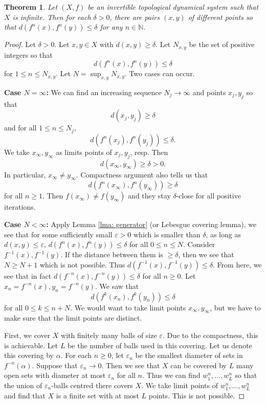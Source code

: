 \documentclass[12pt]{article}
\newtheorem{theorem}{Theorem}[section]
\theoremstyle{definition}
\theoremstyle{remark}
\begin{document}
\begin{theorem}
    Let $(X,f)$ be an invertible topological dynamical system such that $X$ is infinite. Then for each $\delta>0$, there are pairs $(x,y)$ of different points so that $d(f^n(x),f^n(y))\leq\delta$ for any $n\in\mathbb{N}$.
\end{theorem}
\begin{proof}
    Let $\delta>0$. Let $x,y\in X$ with $d(x,y)\geq \delta$. Let $N_{x,y}$ be the set of positive integers so that
    \[
    d(f^n(x),f^n(y))\leq \delta
    \]
    for $1\leq n\leq N_{x,y}.$ Let $N=\sup_{x,y}N_{x,y}.$ Two cases can occur.

    \textbf{Case $N=\infty$:} We can find an increasing sequence $N_j\to\infty$ and points $x_j,y_j$ so that
    \[
    d(x_j,y_j)\geq \delta
    \]
    and for all $1\leq n\leq N_j,$
    \[
    d(f^n(x_j),f^n(y_j))\leq \delta.
    \]
    We take $x_\infty,y_\infty$ as limits points of $x_j,y_j$, resp. Then
    \[
    d(x_\infty,y_\infty)\geq \delta>0.
    \]
    In particular, $x_\infty\neq y_\infty.$ Compactness argument also tells us that
    \[
    d(f^n(x_\infty),f^{n}(y_\infty))\geq \delta
    \]
    for all $n\geq 1$. Then $f(x_\infty)\neq f(y_\infty)$ and they stay $\delta$-close for all positive iterations.

    \textbf{Case $N<\infty$:} Apply Lemma \ref{lma: generator} (or Lebesgue covering lemma), we see that for some sufficiently small $\varepsilon>0$ which is smaller than $\delta$, as long as $d(x,y)\leq \varepsilon$, $d(f^n(x),f^{n}(y))\leq \delta$ for all $0\leq n\leq N$. Consider $f^{-1}(x),f^{-1}(y).$ If the distance between them is $\geq \delta$, then we see that $N\geq N+1$ which is not possible. Thus $d(f^{-1}(x),f^{-1}(y))\leq \delta.$ From here, we see that in fact $d(f^{-n}(x),f^{-n}(y))\leq \delta$ for all $n\geq 0.$ Let $x_n=f^{-n}(x),y_n=f^{-n}(y).$ We saw that
    \[
    d(f^k(x_n),f^{k}(y_n))\leq \delta
    \]
    for all $0\leq k\leq n+N$. We would want to take limit points $x_\infty,y_\infty$, but we have to make sure that the limit points are distinct. 

    First, we cover $X$ with finitely many balls of size $\varepsilon$. Due to the compactness, this is achievable. Let $L$ be the number of balls used in this covering. Let us denote this covering by $\alpha$. For each $n\geq 0$, let $\varepsilon_n$ be the smallest diameter of sets in $f^{-n}(\alpha).$ Suppose that $\varepsilon_n\to 0.$ Then we see that $X$ can be covered by $L$ many open sets with diameter at most $\varepsilon_n$ for all $n$. Thus we can find $w^n_1,\dots,w^n_L$ so that the union of $\varepsilon_n$-balls centred there covers $X$. We take limit points of $w^n_1,\dots,w^n_L$ and find that $X$ is a finite set with at most $L$ points. This is not possible.


\end{proof}
\end{document}
